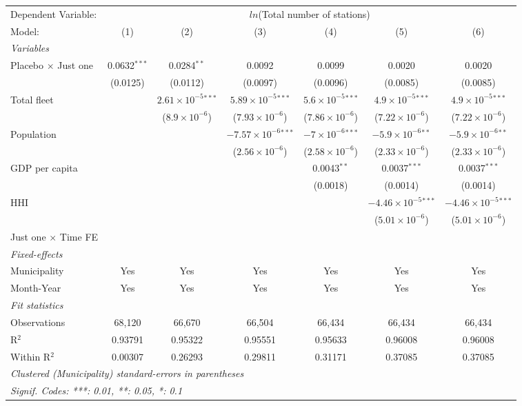 \documentclass[
]{article}
\begin{document}
\begin{tabular}{lcccccc}
\tabularnewline\midrule\midrule
Dependent Variable:&\multicolumn{6}{c}{$ln$(Total number of stations)}\\
Model:&(1) & (2) & (3) & (4) & (5) & (6)\\
\midrule \emph{Variables}&   &   &   &   &   &  \\
Placebo $\times $ Just one & 0.0632$^{***}$ & 0.0284$^{**}$ & 0.0092 & 0.0099 & 0.0020 & 0.0020\\
  &(0.0125) & (0.0112) & (0.0097) & (0.0096) & (0.0085) & (0.0085)\\
Total fleet &    & $2.61\times 10^{-5}$$^{***}$ & $5.89\times 10^{-5}$$^{***}$ & $5.6\times 10^{-5}$$^{***}$ & $4.9\times 10^{-5}$$^{***}$ & $4.9\times 10^{-5}$$^{***}$\\
  &   & ($8.9\times 10^{-6}$) & ($7.93\times 10^{-6}$) & ($7.86\times 10^{-6}$) & ($7.22\times 10^{-6}$) & ($7.22\times 10^{-6}$)\\
Population &    &    & $-7.57\times 10^{-6}$$^{***}$ & $-7\times 10^{-6}$$^{***}$ & $-5.9\times 10^{-6}$$^{**}$ & $-5.9\times 10^{-6}$$^{**}$\\
  &   &    & ($2.56\times 10^{-6}$) & ($2.58\times 10^{-6}$) & ($2.33\times 10^{-6}$) & ($2.33\times 10^{-6}$)\\
GDP per capita &    &    &    & 0.0043$^{**}$ & 0.0037$^{***}$ & 0.0037$^{***}$\\
  &   &    &    & (0.0018) & (0.0014) & (0.0014)\\
HHI &    &    &    &    & $-4.46\times 10^{-5}$$^{***}$ & $-4.46\times 10^{-5}$$^{***}$\\
  &   &    &    &    & ($5.01\times 10^{-6}$) & ($5.01\times 10^{-6}$)\\
Just one $\times$ Time FE &  &  &  &  &  & \\
\midrule \emph{Fixed-effects}&   &   &   &   &   &  \\
Municipality & Yes & Yes & Yes & Yes & Yes & Yes\\
Month-Year & Yes & Yes & Yes & Yes & Yes & Yes\\
\midrule \emph{Fit statistics}&  & & & & & \\
Observations & 68,120&66,670&66,504&66,434&66,434&66,434\\
R$^2$ & 0.93791&0.95322&0.95551&0.95633&0.96008&0.96008\\
Within R$^2$ & 0.00307&0.26293&0.29811&0.31171&0.37085&0.37085\\
\midrule\midrule\multicolumn{7}{l}{\emph{Clustered (Municipality) standard-errors in parentheses}}\\
\multicolumn{7}{l}{\emph{Signif. Codes: ***: 0.01, **: 0.05, *: 0.1}}\\
\end{tabular}
\end{document}

